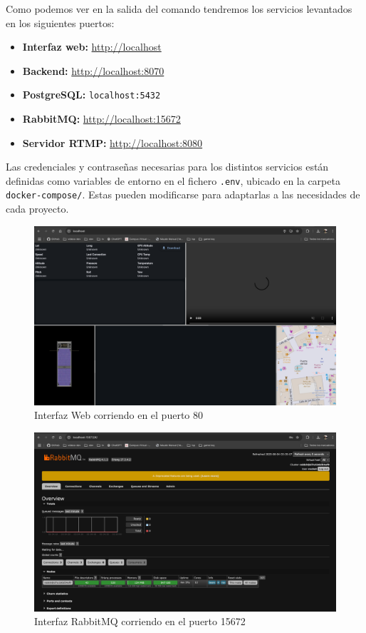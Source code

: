 Como podemos ver en la salida del comando tendremos los servicios levantados en los siguientes puertos:
\begin{itemize}
    \item \textbf{Interfaz web:} \url{http://localhost}
    \item \textbf{Backend:} \url{http://localhost:8070}
    \item \textbf{PostgreSQL:} \texttt{localhost:5432}
    \item \textbf{RabbitMQ:} \url{http://localhost:15672}
    \item \textbf{Servidor RTMP:} \url{http://localhost:8080}
\end{itemize}

Las credenciales y contraseñas necesarias para los distintos servicios están definidas como variables de entorno en el fichero \texttt{.env}, ubicado en la carpeta \texttt{docker-compose/}. Estas pueden modificarse para adaptarlas a las necesidades de cada proyecto.

\begin{figure}[H]
    \centering
    \includegraphics[width=1\textwidth]{Imagenes/Bitmap/interfaz_local}
    \caption{Interfaz Web corriendo en el puerto 80}
    \label{fig:interfaz_local}
\end{figure}

\begin{figure}[H]
    \centering
    \includegraphics[width=1\textwidth]{Imagenes/Bitmap/interfaz_rabbit}
    \caption{Interfaz RabbitMQ corriendo en el puerto 15672}
    \label{fig:interfaz_rabbit}
\end{figure}
